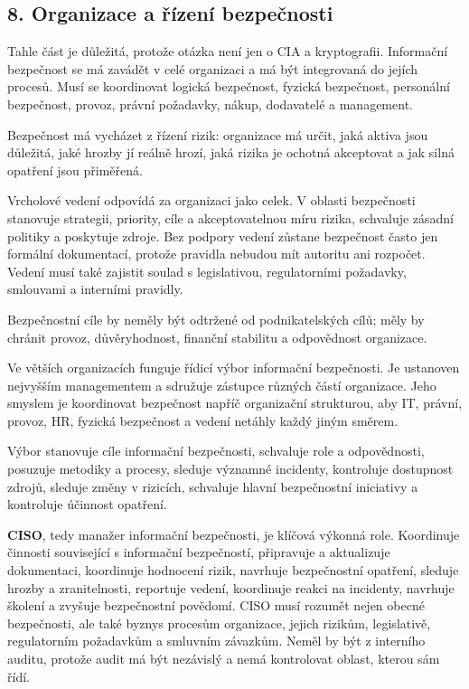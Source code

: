 \documentclass[11pt,a4paper]{article}
\begin{document}
\subsection*{8. Organizace a řízení bezpečnosti}

Tahle část je důležitá, protože otázka není jen o CIA a kryptografii. Informační bezpečnost se má zavádět v celé organizaci a má být integrovaná do jejích procesů. Musí se koordinovat logická bezpečnost, fyzická bezpečnost, personální bezpečnost, provoz, právní požadavky, nákup, dodavatelé a management.

Bezpečnost má vycházet z řízení rizik: organizace má určit, jaká aktiva jsou důležitá, jaké hrozby jí reálně hrozí, jaká rizika je ochotná akceptovat a jak silná opatření jsou přiměřená.

Vrcholové vedení odpovídá za organizaci jako celek. V oblasti bezpečnosti stanovuje strategii, priority, cíle a akceptovatelnou míru rizika, schvaluje zásadní politiky a poskytuje zdroje. Bez podpory vedení zůstane bezpečnost často jen formální dokumentací, protože pravidla nebudou mít autoritu ani rozpočet. Vedení musí také zajistit soulad s legislativou, regulatorními požadavky, smlouvami a interními pravidly.

Bezpečnostní cíle by neměly být odtržené od podnikatelských cílů; měly by chránit provoz, důvěryhodnost, finanční stabilitu a odpovědnost organizace.

Ve větších organizacích funguje řídicí výbor informační bezpečnosti. Je ustanoven nejvyšším managementem a sdružuje zástupce různých částí organizace. Jeho smyslem je koordinovat bezpečnost napříč organizační strukturou, aby IT, právní, provoz, HR, fyzická bezpečnost a vedení netáhly každý jiným směrem.

Výbor stanovuje cíle informační bezpečnosti, schvaluje role a odpovědnosti, posuzuje metodiky a procesy, sleduje významné incidenty, kontroluje dostupnost zdrojů, sleduje změny v rizicích, schvaluje hlavní bezpečnostní iniciativy a kontroluje účinnost opatření.

\textbf{CISO}, tedy manažer informační bezpečnosti, je klíčová výkonná role. Koordinuje činnosti související s informační bezpečností, připravuje a aktualizuje dokumentaci, koordinuje hodnocení rizik, navrhuje bezpečnostní opatření, sleduje hrozby a zranitelnosti, reportuje vedení, koordinuje reakci na incidenty, navrhuje školení a zvyšuje bezpečnostní povědomí. CISO musí rozumět nejen obecné bezpečnosti, ale také byznys procesům organizace, jejich rizikům, legislativě, regulatorním požadavkům a smluvním závazkům. Neměl by být z interního auditu, protože audit má být nezávislý a nemá kontrolovat oblast, kterou sám řídí.
\end{document}
